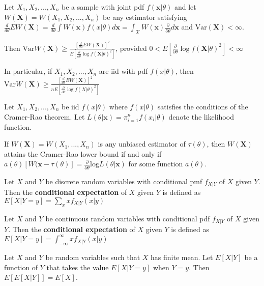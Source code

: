 \begin{thm}
    Let $X_1, X_2, ..., X_n$ be a sample with joint pdf $f(\bm{x} | \theta)$ and let $W(\bm{X}) = W(X_1, X_2, ..., X_n)$ be any estimator satisfying $\frac{d}{d\theta} EW(\bm{X}) = \frac{d}{d\theta} \int W(\bm{x}) f(x | \theta) d\bm{x} = \int_{\mathcal{X}} W(\bm{x}) \frac{\partial}{\partial \theta} d\bm{x}$ and $\text{Var}(\bm{X}) < \infty$.

    Then $\text{Var}W(\bm{X}) \geq \frac{[\frac{d}{d\theta} EW(\bm{X})]^2}{E[\frac{\partial}{\partial \theta} \log f(\bm{X}|\theta)^2]}$, provided $0 <  E[\frac{\partial}{\partial \theta} \log f(\bm{X}|\theta)^2] < \infty$

    In particular, if $X_1, X_2, ..., X_n$ are iid with pdf $f(x|\theta)$, then $\text{Var}W(\bm{X}) \geq \frac{[\frac{d}{d\theta} EW(\bm{X})]^2}{n E[\frac{\partial}{\partial \theta} \log f(X|\theta)^2]}$

\end{thm}

\begin{thm}
    Let $X_1, X_2, ..., X_n$ be iid $f(x|\theta)$ where $f(x|\theta)$ satisfies the conditions of the Cramer-Rao theorem. Let $L(\theta|\bm{x}) = \pi_{i = 1}^n f(x_i|\theta)$ denote the likelihood function.

    If $W(\bm{X}) = W(X_1,..., X_n)$ is any unbiased estimator of $\tau(\theta)$, then $W(\bm{X})$ attains the Cramer-Rao lower bound if and only if $a(\theta)[W(\bm{x} - \tau(\theta)] = \frac{\partial}{\partial \theta} \text{log}L(\theta|\bm{x})$ for some function $a(\theta)$.
\end{thm}

\begin{defn}
    Let $X$ and $Y$ be discrete random variables with conditional pmf $f_{X|Y}$ of $X$ given $Y$. Then the \textbf{conditional expectation} of $X$ given $Y$ is defined as $E[X|Y=y] = \sum_{x} x f_{X|Y}(x|y)$

    Let $X$ and $Y$ be continuous random variables with conditional pdf $f_{X|Y}$ of $X$ given $Y$. Then the \textbf{conditional expectation} of $X$ given $Y$ is defined as $E[X|Y=y] = \int_{-\infty}^\infty x f_{X|Y}(x|y)$
\end{defn}


\begin{thm}
    Let $X$ and $Y$ be random variables such that $X$ has finite mean. 
    Let $E[X|Y]$ be a function of $Y$ that takes the value $E[X|Y=y]$ when $Y=y$.
    Then $E[E[X|Y]] = E[X]$.
\end{thm}

